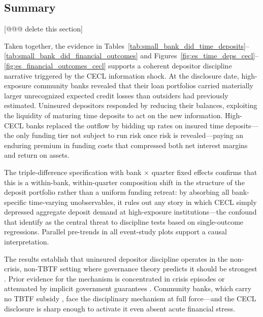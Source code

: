 \subsection{Summary} [@@@ delete this section]
\label{sec:results:summary}

Taken together, the evidence in
Tables~\ref{tab:small_bank_did_time_deposits}--\ref{tab:small_bank_did_financial_outcomes}
and Figures~\ref{fig:es_time_deps_cecl}--\ref{fig:es_financial_outcomes_cecl}
supports a coherent depositor discipline narrative triggered by the CECL
information shock.  At the disclosure date, high-exposure community banks revealed
that their loan portfolios carried materially larger unrecognized expected credit
losses than outsiders had previously estimated.  Uninsured depositors responded
by reducing their balances, exploiting the liquidity of maturing time deposits
to act on the new information.  High-CECL banks replaced the outflow by bidding
up rates on insured time deposits---the only funding tier not subject to run risk
once risk is revealed---paying an enduring premium in funding costs that
compressed both net interest margins and return on assets.

The triple-difference specification with bank $\times$ quarter fixed effects
confirms that this is a within-bank, within-quarter composition shift in the
structure of the deposit portfolio rather than a uniform funding retreat: by
absorbing all bank-specific time-varying unobservables, it rules out any story in
which CECL simply depressed aggregate deposit demand at high-exposure
institutions---the confound that \citet{covitz2004market} identify as the central
threat to discipline tests based on single-outcome regressions.  Parallel
pre-trends in all event-study plots support a causal interpretation.

The results establish that uninsured depositor discipline operates in the
non-crisis, non-TBTF setting where governance theory predicts it should be
strongest \citep{calomiris1991role, flannery1996evidence}.  Prior evidence for the
mechanism is concentrated in crisis episodes \citep{martinez2001depositors,
iyer2016tale} or attenuated by implicit government guarantees \citep{bennett2015market,
berger2015depositors}.  Community banks, which carry no TBTF subsidy
\citep{jacewitz2018deposit, o1990deposit}, face the disciplinary mechanism at
full force---and the CECL disclosure is sharp enough to activate it even absent
acute financial stress.

